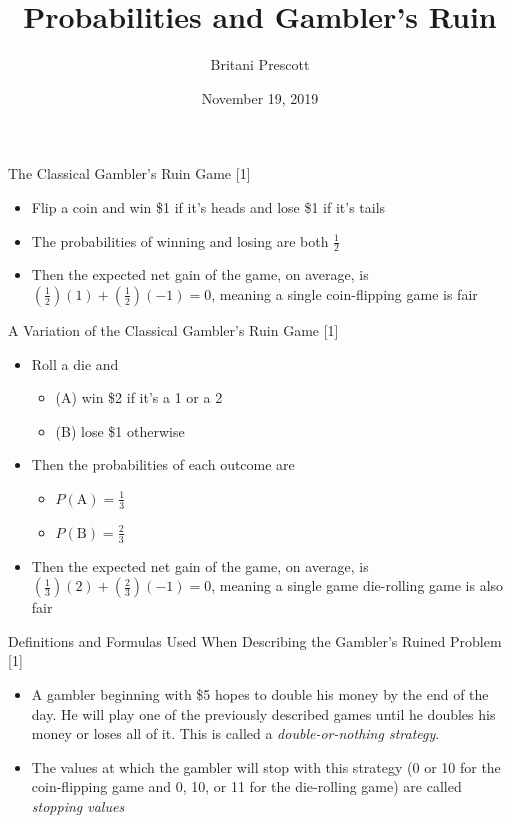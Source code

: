 \documentclass[14pt]{beamer}
\title{Probabilities and Gambler's Ruin}
\author{Britani Prescott}
\date{November 19, 2019}
\begin{document}
\frame{\titlepage}

\begin{frame}{The Classical Gambler's Ruin Game [1]}
 \begin{itemize}
     \item Flip a coin and win \$1 if it's heads and lose \$1 if it's tails
     \item The probabilities of winning and losing are both $\frac{1}{2}$
     \item Then the expected net gain of the game, on average, is $\left( \frac{1}{2} \right)(1) + \left( \frac{1}{2} \right)(-1) = 0$, meaning a single coin-flipping game is fair
 \end{itemize}
\end{frame}

\begin{frame}{A Variation of the Classical Gambler's Ruin Game [1]}
 \begin{itemize}
     \item Roll a die and 
     \begin{itemize}
         \item (A) win \$2 if it's a 1 or a 2
         \item (B) lose \$1 otherwise
     \end{itemize}
     \item Then the probabilities of each outcome are 
     \begin{itemize}
         \item $P(\text{A}) = \frac{1}{3}$
         \item $P(\text{B}) = \frac{2}{3}$
     \end{itemize}
     \item Then the expected net gain of the game, on average, is $\left( \frac{1}{3} \right)(2) + \left( \frac{2}{3} \right)(-1) = 0$, meaning a single game die-rolling game is also fair
 \end{itemize}   
\end{frame}

\begin{frame}{Definitions and Formulas Used When Describing the Gambler's Ruined Problem [1]}
 \begin{itemize}
     \item A gambler beginning with \$5 hopes to double his money by the end of the day. He will play one of the previously described games until he doubles his money or loses all of it.  This is called a \textit{double-or-nothing strategy}.
     \item The values at which the gambler will stop with this strategy (0 or 10 for the coin-flipping game and 0, 10, or 11 for the die-rolling game) are called \textit{stopping values}
 \end{itemize}  
\end{frame}
\end{document}
